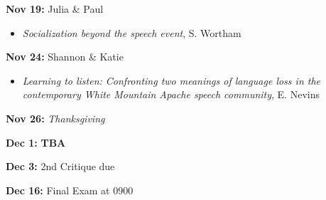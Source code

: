 \documentclass[12pt]{article}
\providecommand{\tightlist}{%
  \setlength{\itemsep}{0pt}\setlength{\parskip}{0pt}}
\begin{document}
\textbf{Nov 19:} Julia \& Paul

\begin{itemize}
\tightlist
\item
  \emph{Socialization beyond the speech event}, S. Wortham
\end{itemize}

\textbf{Nov 24:} Shannon \& Katie

\begin{itemize}
\tightlist
\item
  \emph{Learning to listen: Confronting two meanings of language loss in
  the contemporary White Mountain Apache speech community}, E. Nevins
\end{itemize}

\textbf{Nov 26:} \emph{Thanksgiving}

\textbf{Dec 1:} \textbf{TBA}

\textbf{Dec 3:} 2nd Critique due

\textbf{Dec 16:} Final Exam at 0900
\end{document}

